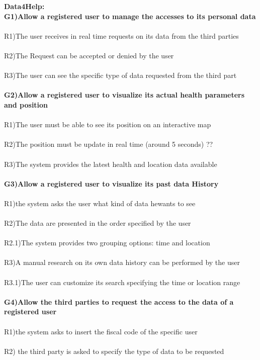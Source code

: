 \textbf{Data4Help:} \\
\textbf{G1)Allow a registered user to manage the accesses to its personal data} \\ \\
R1)The user receives in real time requests on its data from the third parties \\ \\
R2)The Request can be accepted or denied by the user\\ \\
R3)The user can see the specific type of data requested from the third part \\ \\ 
\textbf{ G2)Allow a registered user to visualize its actual health parameters and position} \\ \\
R1)The user must be able to see its position on an interactive map \\ \\
R2)The position must be update in real time (around 5 seconds) ?? \\ \\
R3)The system provides the latest health and location data available \\ \\
\textbf{G3)Allow a registered user to visualize its past data History} \\ \\
R1)the system asks the user what kind of data he\she wants to see \\ \\
R2)The data are presented in the order specified by the user  \\ \\
R2.1)The system provides two grouping options: time and location \\ \\
R3)A manual research on its own data history can be performed by the user \\ \\
R3.1)The user can customize its search specifying the time or location range \\ \\ 
\textbf{G4)Allow the third parties to request the access to the data of a registered user} \\ \\
R1)the system asks to insert the fiscal code of the specific user \\ \\
R2) the third party is asked to specify the type of data to be requested\\ \\ 
